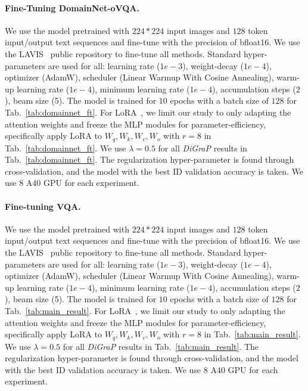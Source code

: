 \paragraph{Fine-Tuning DomainNet-oVQA.} We use the model pretrained with $224*224$ input images and $128$ token input/output text sequences and fine-tune with the precision of bfloat16. We use the LAVIS~\citep{li2022lavislibrarylanguagevisionintelligence} public repository to fine-tune all methods. Standard hyper-parameters are used for all: learning rate ($1e-3$), weight-decay ($1e-4$), optimizer (AdamW), scheduler (Linear Warmup With Cosine Annealing), warm-up learning rate ($1e-4$), minimum learning rate ($1e-4$), accumulation steps ($2$), beam size (5). The model is trained for $10$ epochs with a batch size of $128$ for Tab.~\ref{tab:domainnet_ft}. For LoRA~\citep{hu_lora_2021}, we limit our study to only adapting the attention weights and freeze the MLP modules for parameter-efficiency, specifically apply LoRA to $W_q, W_k, W_v, W_o$ with $r=8$ in Tab.~\ref{tab:domainnet_ft}. We use $\lambda=0.5$ for all \emph{DiGraP} results in Tab.~\ref{tab:domainnet_ft}. The regularization hyper-parameter is found through cross-validation, and the model with the best ID validation accuracy is taken. We use 8 A40 GPU for each experiment.

\paragraph{Fine-tuning VQA.} We use the model pretrained with $224*224$ input images and $128$ token input/output text sequences and fine-tune with the precision of bfloat16. We use the LAVIS~\citep{li2022lavislibrarylanguagevisionintelligence} public repository to fine-tune all methods. Standard hyper-parameters are used for all: learning rate ($1e-3$), weight-decay ($1e-4$), optimizer (AdamW), scheduler (Linear Warmup With Cosine Annealing), warm-up learning rate ($1e-4$), minimum learning rate ($1e-4$), accumulation steps ($2$), beam size (5). The model is trained for $10$ epochs with a batch size of $128$ for Tab.~\ref{tab:main_result}. For LoRA~\citep{hu_lora_2021}, we limit our study to only adapting the attention weights and freeze the MLP modules for parameter-efficiency, specifically apply LoRA to $W_q, W_k, W_v, W_o$ with $r=8$ in Tab.~\ref{tab:main_result}. We use $\lambda=0.5$ for all \emph{DiGraP} results in Tab.~\ref{tab:main_result}. The regularization hyper-parameter is found through cross-validation, and the model with the best ID validation accuracy is taken. We use 8 A40 GPU for each experiment.

